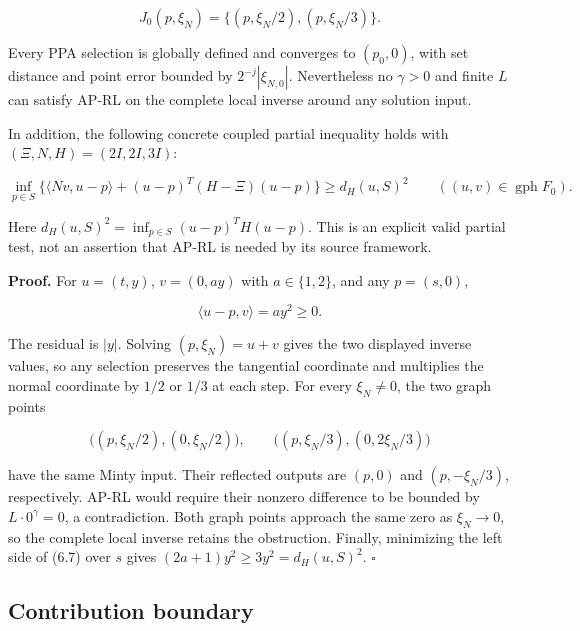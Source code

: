 \documentclass[11pt,a4paper]{article}
\theoremstyle{plain}
\theoremstyle{definition}
\theoremstyle{remark}
\begin{document}
\[
J_0(p,\xi_N)=\{(p,\xi_N/2),(p,\xi_N/3)\}.
\]

Every PPA selection is globally defined and converges to \((p_0,0)\),
with set distance and point error bounded by \(2^{-j}|\xi_{N,0}|\).
Nevertheless no \(\gamma>0\) and finite \(L\) can satisfy AP-RL on the
complete local inverse around any solution input.

In addition, the following concrete coupled partial inequality holds
with \((\Xi,N,H)=(2I,2I,3I)\):

\[
\inf_{p\in S}
\bigl\{\langle Nv,u-p\rangle+(u-p)^T(H-\Xi)(u-p)\bigr\}
\ge d_H(u,S)^2
\qquad((u,v)\in\operatorname{gph}F_0).
\tag{6.7}
\]

Here \(d_H(u,S)^2=\inf_{p\in S}(u-p)^TH(u-p)\). This is an explicit
valid partial test, not an assertion that AP-RL is needed by its source
framework.

\textbf{Proof.} For \(u=(t,y)\), \(v=(0,ay)\) with \(a\in\{1,2\}\), and
any \(p=(s,0)\),

\[
\langle u-p,v\rangle=ay^2\ge0.
\]

The residual is \(|y|\). Solving \((p,\xi_N)=u+v\) gives the two
displayed inverse values, so any selection preserves the tangential
coordinate and multiplies the normal coordinate by \(1/2\) or \(1/3\) at
each step. For every \(\xi_N\ne0\), the two graph points

\[
\bigl((p,\xi_N/2),(0,\xi_N/2)\bigr),\qquad
\bigl((p,\xi_N/3),(0,2\xi_N/3)\bigr)
\]

have the same Minty input. Their reflected outputs are \((p,0)\) and
\((p,-\xi_N/3)\), respectively. AP-RL would require their nonzero
difference to be bounded by \(L\cdot0^\gamma=0\), a contradiction. Both
graph points approach the same zero as \(\xi_N\to0\), so the complete
local inverse retains the obstruction. Finally, minimizing the left side
of (6.7) over \(s\) gives \((2a+1)y^2\ge3y^2=d_H(u,S)^2\). \(\square\)

\hypertarget{contribution-boundary}{%
\subsection{Contribution boundary}\label{contribution-boundary}}
\end{document}
